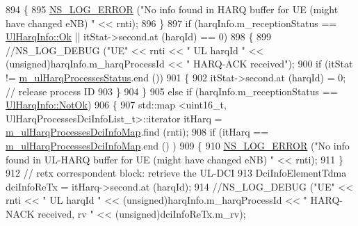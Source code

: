 \begin{DoxyCode}
894                         \{
895                                 \hyperlink{group__logging_ga0261a8db1d4ac5f79417d117634fd455}{NS\_LOG\_ERROR} (\textcolor{stringliteral}{"No info found in HARQ buffer for UE (might have
       changed eNB) "} << rnti);
896                         \}
897                         \textcolor{keywordflow}{if} (harqInfo.m\_receptionStatus == \hyperlink{structns3_1_1UlHarqInfo_af1ea9a1ce02c9b4a551ac978484a4336ad61a738c75abe251c05daa2461ecf308}{UlHarqInfo::Ok} || itStat->second.at
       (harqId) == 0)
898                         \{
899                                 \textcolor{comment}{//NS\_LOG\_DEBUG ("UE" << rnti << " UL harqId " <<
       (unsigned)harqInfo.m\_harqProcessId << " HARQ-ACK received");}
900                                 \textcolor{keywordflow}{if} (itStat != \hyperlink{classns3_1_1MmWaveFlexTtiMacScheduler_af728e6ddeaaf55536ca842682904d64a}{m\_ulHarqProcessesStatus}.end ())
901                                 \{
902                                         itStat->second.at (harqId) = 0;  \textcolor{comment}{// release process ID}
903                                 \}
904                         \}
905                         \textcolor{keywordflow}{else} \textcolor{keywordflow}{if} (harqInfo.m\_receptionStatus == \hyperlink{structns3_1_1UlHarqInfo_af1ea9a1ce02c9b4a551ac978484a4336a488db5f30de0c73647fed90c4a994a83}{UlHarqInfo::NotOk})
906                         \{
907                                 std::map <uint16\_t, UlHarqProcessesDciInfoList\_t>::iterator itHarq = 
      \hyperlink{classns3_1_1MmWaveFlexTtiMacScheduler_ad18cf8a17f05488fc679bd891175864f}{m\_ulHarqProcessesDciInfoMap}.find (rnti);
908                                 \textcolor{keywordflow}{if} (itHarq == \hyperlink{classns3_1_1MmWaveFlexTtiMacScheduler_ad18cf8a17f05488fc679bd891175864f}{m\_ulHarqProcessesDciInfoMap}.end ()
      )
909                                 \{
910                                         \hyperlink{group__logging_ga0261a8db1d4ac5f79417d117634fd455}{NS\_LOG\_ERROR} (\textcolor{stringliteral}{"No info found in UL-HARQ buffer for UE
       (might have changed eNB) "} << rnti);
911                                 \}
912                                 \textcolor{comment}{// retx correspondent block: retrieve the UL-DCI}
913                                 DciInfoElementTdma dciInfoReTx = itHarq->second.at (harqId);
914                                 \textcolor{comment}{//NS\_LOG\_DEBUG ("UE" << rnti << " UL harqId " <<
       (unsigned)harqInfo.m\_harqProcessId << " HARQ-NACK received, rv " << (unsigned)dciInfoReTx.m\_rv);}

\end{DoxyCode}
